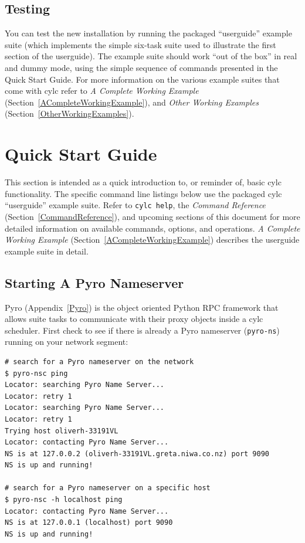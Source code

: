 \documentclass[11pt,a4paper]{article}
\begin{document}
\subsection{Testing} 
\label{Testing}

You can test the new installation by running the packaged ``userguide''
example suite (which implements the simple six-task suite used to 
illustrate the first section of the userguide). The example suite
should work ``out of the box'' in real and dummy mode, using the simple
sequence of commands presented in the Quick Start Guide. 
For more information on the various example suites that come with cylc
refer to {\em A Complete Working Example}
(Section~\ref{ACompleteWorkingExample}), and {\em Other Working
Examples} (Section~\ref{OtherWorkingExamples}).  

\pagebreak
\section{Quick Start Guide} 
\label{QuickStartGuide}

\lstset{language=bash}

This section is intended as a quick introduction to, or reminder of,
basic cylc functionality. The specific command line listings below use
the packaged cylc ``userguide'' example suite. Refer to 
\lstinline=cylc help=, the {\em Command Reference}
(Section~\ref{CommandReference}), and
upcoming sections of this document for more detailed information on
available commands, options, and operations.  {\em A Complete Working
Example} (Section~\ref{ACompleteWorkingExample}) describes the
userguide example suite in detail.

\subsection{Starting A Pyro Nameserver}
\label{QuickStartingAPyroNameserver}

Pyro (Appendix~\ref{Pyro}) is the object oriented Python RPC framework
that allows suite tasks to communicate with their proxy objects inside
a cylc scheduler. First check to see if there is already a Pyro
nameserver (\lstinline=pyro-ns=) running on your network segment:

\begin{lstlisting}
# search for a Pyro nameserver on the network
$ pyro-nsc ping
Locator: searching Pyro Name Server...
Locator: retry 1
Locator: searching Pyro Name Server...
Locator: retry 1
Trying host oliverh-33191VL
Locator: contacting Pyro Name Server...
NS is at 127.0.0.2 (oliverh-33191VL.greta.niwa.co.nz) port 9090
NS is up and running!

# search for a Pyro nameserver on a specific host
$ pyro-nsc -h localhost ping
Locator: contacting Pyro Name Server...
NS is at 127.0.0.1 (localhost) port 9090
NS is up and running!
\end{lstlisting}
\end{document}
